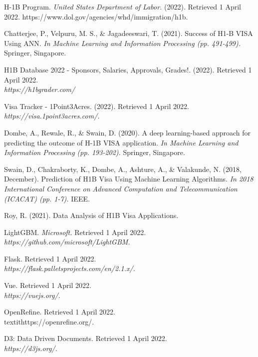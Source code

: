\documentclass[sigconf]{acmart}
\begin{document}
\begin{thebibliography}{12}

\bibitem{} 
	H-1B Program. 
\textit{United States Department of Labor.} 
(2022). 
Retrieved 1 April 2022. https://www.dol.gov/agencies/whd/immigration/h1b. 

\bibitem{}
Chatterjee, P., Velpuru, M. S., \& Jagadeeswari, T. 
(2021). 
Success of H1-B VISA Using ANN. 
\textit{In Machine Learning and Information Processing (pp. 491-499).}
 Springer, Singapore.

\bibitem{}
H1B Database 2022 - Sponsors, Salaries, Approvals, Grades!. 
(2022). 
Retrieved 1 April 2022. 
\\\textit{https://h1bgrader.com/}

\bibitem{}
Visa Tracker - 1Point3Acres. 
(2022). 
Retrieved 1 April 2022.  
\\\textit{https://visa.1point3acres.com/. }

\bibitem{}
Dombe, A., Rewale, R., \& Swain, D. 
(2020). 
A deep learning-based approach for predicting the outcome of H-1B VISA application. 
\textit{In Machine Learning and Information Processing (pp. 193-202).}
 Springer, Singapore.

\bibitem{}
Swain, D., Chakraborty, K., Dombe, A., Ashture, A., \& Valakunde, N. 
(2018, December). 
Prediction of H1B Visa Using Machine Learning Algorithms. 
\textit{In 2018 International Conference on Advanced Computation and Telecommunication (ICACAT) (pp. 1-7).} 
IEEE. 

\bibitem{}
Roy, R. (2021). 
Data Analysis of H1B Visa Applications.

\bibitem{}
LightGBM. 
\textit{Microsoft.} 
Retrieved 1 April 2022. 
\\\textit{https://github.com/microsoft/LightGBM.}

\bibitem{}
Flask. 
Retrieved 1 April 2022. 
\\\textit{https://flask.palletsprojects.com/en/2.1.x/.}

\bibitem{}
Vue. 
Retrieved 1 April 2022. 
\\\textit{https://vuejs.org/.}

\bibitem{}
OpenRefine. 
Retrieved 1 April 2022. 
\\textit{https://openrefine.org/.}

\bibitem{}
D3: Data Driven Documents. 
Retrieved 1 April 2022. 
\\\textit{https://d3js.org/.}


\end{thebibliography}
\end{document}
